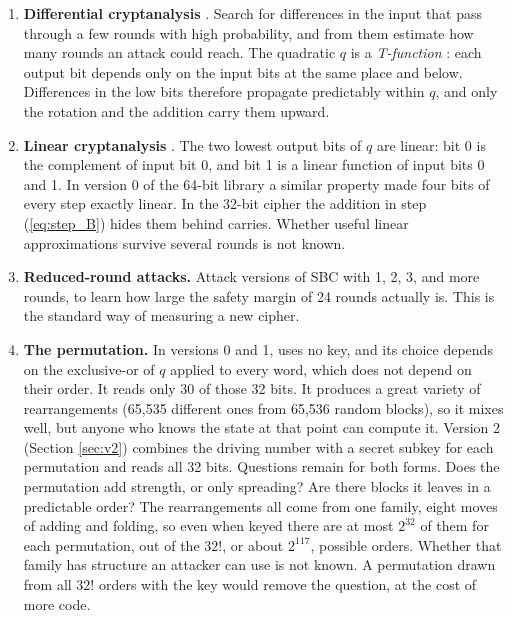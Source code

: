 \begin{enumerate}
\item \textbf{Differential cryptanalysis} \cite{biham1991}. Search for
      differences in the input that pass through a few rounds with high
      probability, and from them estimate how many rounds an attack could
      reach. The quadratic $q$ is a \emph{T-function} \cite{klimov2002}: each
      output bit depends only on the input bits at the same place and below.
      Differences in the low bits therefore propagate predictably within $q$,
      and only the rotation and the addition carry them upward.

\item \textbf{Linear cryptanalysis} \cite{matsui1993}. The two lowest output
      bits of $q$ are linear: bit 0 is the complement of input bit 0, and bit 1
      is a linear function of input bits 0 and 1. In version 0 of the 64-bit
      library a similar property made four bits of every step exactly linear.
      In the 32-bit cipher the addition in step (\ref{eq:step_B}) hides them
      behind carries. Whether useful linear approximations survive several
      rounds is not known.

\item \textbf{Reduced-round attacks.} Attack versions of SBC with 1, 2, 3, and
      more rounds, to learn how large the safety margin of 24 rounds actually
      is. This is the standard way of measuring a new cipher.

\item \label{item:perm}\textbf{The permutation.} In versions 0 and 1,
       uses no key, and its choice depends on the exclusive-or of
      $q$ applied to every word, which does not depend on their order. It reads
      only 30 of those 32 bits. It produces a great variety of rearrangements
      (65,535 different ones from 65,536 random blocks), so it mixes well, but
      anyone who knows the state at that point can compute it. Version 2
      (Section \ref{sec:v2}) combines the driving number with a secret subkey
      for each permutation and reads all 32 bits. Questions remain for both
      forms. Does the permutation add strength, or only spreading? Are there
      blocks it leaves in a predictable order? The rearrangements all come from
      one family, eight moves of adding and folding, so even when keyed there
      are at most $2^{32}$ of them for each permutation, out of the $32!$, or
      about $2^{117}$, possible orders. Whether that family has structure an
      attacker can use is not known. A permutation drawn from all $32!$ orders
      with the key would remove the question, at the cost of more code.


\end{enumerate}
